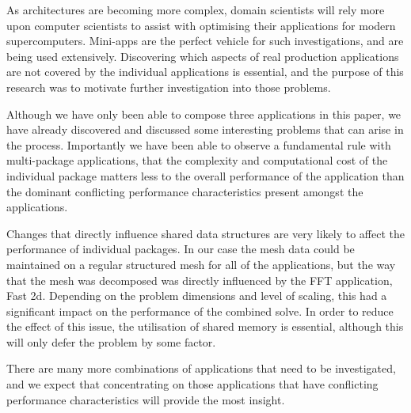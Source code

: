 \documentclass[runningheads,a4paper]{llncs}
\begin{document}
As architectures are becoming more complex, domain scientists will rely more upon computer scientists to assist with optimising their applications for modern supercomputers. Mini-apps are the perfect vehicle for such investigations, and are being used extensively. Discovering which aspects of real production applications are not covered by the individual applications is essential, and the purpose of this research was to motivate further investigation into those problems.

Although we have only been able to compose three applications in this paper, we have already discovered and discussed some interesting problems that can arise in the process. Importantly we have been able to observe a fundamental rule with multi-package applications, that the complexity and computational cost of the individual package matters less to the overall performance of the application than the dominant conflicting performance characteristics present amongst the applications.

Changes that directly influence shared data structures are very likely to affect the performance of individual packages. In our case the mesh data could be maintained on a regular structured mesh for all of the applications, but the way that the mesh was decomposed was directly influenced by the FFT application, Fast 2d. Depending on the problem dimensions and level of scaling, this had a significant impact on the performance of the combined solve. In order to reduce the effect of this issue, the utilisation of shared memory is essential, although this will only defer the problem by some factor.

There are many more combinations of applications that need to be investigated, and we expect that concentrating on those applications that have conflicting performance characteristics will provide the most insight.



\end{document}
